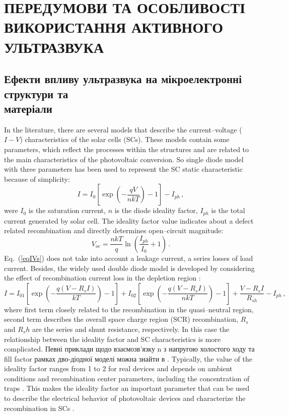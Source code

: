 \chapter{\MakeUppercase{Передумови та особливості використання активного ультразвука}}



\section{Ефекти впливу ультразвука на мікроелектронні структури та \\ матеріали \label{Oglyad}}
\cite{Breitenstein2013,SINKE2019,Wijaranakula,Narland,Sakauchi,Si_Auger,FeBLight,FeBLight2,FeB:Schmidt,FeBLight3,FeBCoDop,FeBDecay}

In the literature, there are several models that describe the current--voltage ($I-V$) characteristics of the solar cells (SCs).
These models contain some parameters, which reflect the processes within the structures and are related to the main characteristics of the photovoltaic conversion.
So single diode model with three parameters has been used to represent the SC static characteristic because of simplicity:
\begin{equation}
\label{eqIVs}
    I=I_{0}\left[\exp\left(-\frac{qV}{nkT}\right)-1\right]-I_{ph}\,,
\end{equation}
were
$I_0$ is the saturation current,
$n$ is the diode ideality factor,
$I_{ph}$ is the total current generated by solar cell.
The ideality factor value indicates about a defect related recombination and directly determines open--circuit magnitude:
\begin{equation}
\label{eqVoc}
    V_{oc}=\frac{nkT}{q}\ln\left(\frac{I_{ph}}{I_0}+1\right)\,.
\end{equation}
Eq.~(\ref{eqIVs}) does not take into account a leakage current, a series losses of load current.
Besides, the widely used double diode model is developed by considering the effect of recombination current loss
in the depletion region \cite{2Diod:Ishaque,2Diod:Buhler,Breitenstein2013}:
\begin{equation}
\label{eqIVd}
    I=I_{01}\left[\exp\left(-\frac{q(V-R_sI)}{kT}\right)-1\right]
      + I_{02}\left[\exp\left(-\frac{q(V-R_sI)}{nkT}\right)-1\right]
      +\frac{V-R_sI}{R_{sh}}
      -I_{ph}\,,
\end{equation}
where
first term closely related to the recombination in the quasi--neutral region,
second term describes the overall space charge region (SCR) recombination,
$R_s$ and $R_sh$ are the series and shunt resistance, respectively.
In this case the relationship between the ideality factor and SC characteristics is more complicated.
Певні приклади щодо взаємозв'язку n з напругою холостого ходу та fill factor  рамках дво-діодної моделі можна знайти в \cite{Olikh2018SM}.
Typically, the value of the ideality factor ranges from 1 to 2 for real devices and depends on ambient conditions and recombination center parameters,
including the concentration of traps \cite{n2_Beier,n2McIntosh,n2Kaminski,HAMEIRI2013251,Heide}.
This makes the ideality factor an important parameter that can be used to describe the electrical behavior of photovoltaic devices and characterize the recombination in SCs \cite{Duan}.

